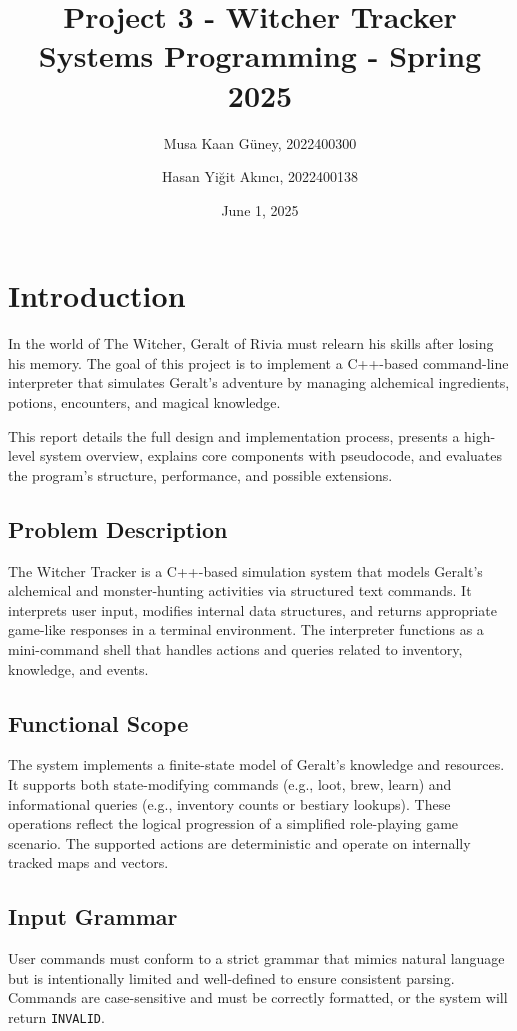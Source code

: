 \documentclass{article}
\title{Project 3 - Witcher Tracker \\
    \large Systems Programming - Spring 2025}
\author{Musa Kaan Güney, 2022400300 
    \and 
    Hasan Yiğit Akıncı, 2022400138}
\date{June 1, 2025}
\begin{document}
\maketitle

\section{Introduction}
In the world of The Witcher, Geralt of Rivia must relearn his skills after losing his memory. The goal of this project is to implement a C++-based command-line interpreter that simulates Geralt's adventure by managing alchemical ingredients, potions, encounters, and magical knowledge.

This report details the full design and implementation process, presents a high-level system overview, explains core components with pseudocode, and evaluates the program's structure, performance, and possible extensions.

\subsection{Problem Description}
The Witcher Tracker is a C++-based simulation system that models Geralt's alchemical and monster-hunting activities via structured text commands. It interprets user input, modifies internal data structures, and returns appropriate game-like responses in a terminal environment. The interpreter functions as a mini-command shell that handles actions and queries related to inventory, knowledge, and events.

\subsection*{Functional Scope}
The system implements a finite-state model of Geralt's knowledge and resources. It supports both state-modifying commands (e.g., loot, brew, learn) and informational queries (e.g., inventory counts or bestiary lookups). These operations reflect the logical progression of a simplified role-playing game scenario. The supported actions are deterministic and operate on internally tracked maps and vectors.

\subsection*{Input Grammar}
User commands must conform to a strict grammar that mimics natural language but is intentionally limited and well-defined to ensure consistent parsing. Commands are case-sensitive and must be correctly formatted, or the system will return \texttt{INVALID}.
\end{document}

